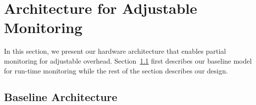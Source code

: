 \section{Architecture for Adjustable Monitoring}
\label{sec:dropping}

In this section, we present our hardware architecture that enables partial
monitoring for adjustable overhead. Section~\ref{sec:dropping.baseline} first
describes our baseline model for run-time monitoring while the rest of the
section describes our design.

\subsection{Baseline Architecture}
\label{sec:dropping.baseline}

